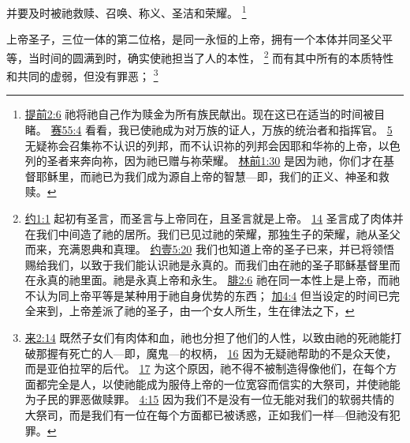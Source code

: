 \documentclass[12pt, a4paper, oneside]{ctexart}
\newcounter{parnum}[section]
\newcommand{\N}{%
   \noindent\refstepcounter{parnum}%
    \makebox[\parindent][l]{\textbf{\arabic{parnum}.}}}
\begin{document}
	并要及时被祂救赎、召唤、称义、圣洁和荣耀。
	\footnote {
		\href{https://biblehub.com/1_timothy/2-6.htm}{提前2:6} 祂将祂自己作为赎金为所有族民献出。现在这已在适当的时间被目睹。
		\href{https://biblehub.com/isaiah/55-4.htm}{赛55:4} 看看，我已使祂成为对万族的证人，万族的统治者和指挥官。
        \href{https://biblehub.com/isaiah/55-5.htm}{5} 无疑祢会召集祢不认识的列邦，而不认识祢的列邦会因耶和华祢的上帝，以色列的圣者来奔向祢，因为祂已赠与祢荣耀。
		\href{https://biblehub.com/1_corinthians/1-30.htm}{林前1:30} 是因为祂，你们才在基督耶稣里，而祂已为我们成为源自上帝的智慧---即，我们的正义、神圣和救赎。
	}

\N 上帝圣子，三位一体的第二位格，是同一永恒的上帝，拥有一个本体并同圣父平等，当时间的圆满到时，确实使祂担当了人的本性，
	\footnote {
		\href{https://biblehub.com/john/1-1.htm}{约1:1} 起初有圣言，而圣言与上帝同在，且圣言就是上帝。
		\href{https://biblehub.com/john/1-14.htm}{14} 圣言成了肉体并在我们中间造了祂的居所。我们已见过祂的荣耀，那独生子的荣耀，祂从圣父而来，充满恩典和真理。
		\href{https://biblehub.com/1_john/5-20.htm}{约壹5:20} 我们也知道上帝的圣子已来，并已将领悟赐给我们，以致于我们能认识祂是永真的。而我们由在祂的圣子耶稣基督里而在永真的祂里面。祂是永真上帝和永生。
		\href{https://biblehub.com/philippians/2-6.htm}{腓2:6} 祂在同一本性上是上帝，而祂不认为同上帝平等是某种用于祂自身优势的东西；
		\href{https://biblehub.com/galatians/4-4.htm}{加4:4} 但当设定的时间已完全来到，上帝差派了祂的圣子，由一个女人所生，生在律法之下，
	}
	而有其中所有的本质特性和共同的虚弱，但没有罪恶；
	\footnote {
		\href{https://biblehub.com/hebrews/2-14.htm}{来2:14} 既然子女们有肉体和血，祂也分担了他们的人性，以致由祂的死祂能打破那握有死亡的人---即，魔鬼---的权柄，
		\href{https://biblehub.com/hebrews/2-16.htm}{16} 因为无疑祂帮助的不是众天使，而是亚伯拉罕的后代。
		\href{https://biblehub.com/hebrews/2-17.htm}{17} 为这个原因，祂不得不被制造得像他们，在每个方面都完全是人，以使祂能成为服侍上帝的一位宽容而信实的大祭司，并使祂能为子民的罪恶做赎罪。
		\href{https://biblehub.com/hebrews/4-15.htm}{4:15} 因为我们不是没有一位无能对我们的软弱共情的大祭司，而是我们有一位在每个方面都已被诱惑，正如我们一样---但祂没有犯罪。
	}
\end{document}
